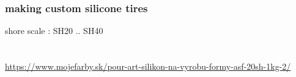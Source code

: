\documentclass{beamer}
\begin{document}
\begin{frame}
  
  \frametitle{\bf making custom silicone tires}
  shore scale : SH20 .. SH40 \\
  
   \\
   \\
  \url{https://www.mojefarby.sk/pour-art-silikon-na-vyrobu-formy-asf-20sh-1kg-2/} 
\end{frame}
\end{document}
